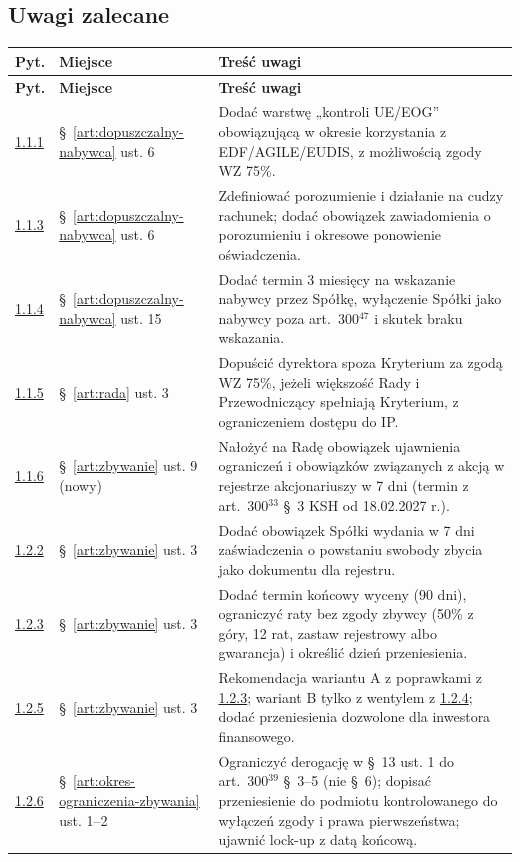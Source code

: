 \documentclass[12pt,a4paper]{report}
\begin{document}
\subsection*{Uwagi zalecane}
\begin{longtable}{@{}p{1.3cm} p{3.3cm} p{9.6cm}@{}}
\toprule
\textbf{Pyt.} & \textbf{Miejsce} & \textbf{Treść uwagi} \\
\midrule
\endfirsthead
\toprule
\textbf{Pyt.} & \textbf{Miejsce} & \textbf{Treść uwagi} \\
\midrule
\endhead
\hyperref[memo:1.1.1]{1.1.1} & §~\ref{art:dopuszczalny-nabywca} ust. 6 & Dodać warstwę „kontroli UE/EOG” obowiązującą w okresie korzystania z EDF/AGILE/EUDIS, z możliwością zgody WZ 75\%. \\
\hyperref[memo:1.1.3]{1.1.3} & §~\ref{art:dopuszczalny-nabywca} ust. 6 & Zdefiniować porozumienie i działanie na cudzy rachunek; dodać obowiązek zawiadomienia o porozumieniu i okresowe ponowienie oświadczenia. \\
\hyperref[memo:1.1.4]{1.1.4} & §~\ref{art:dopuszczalny-nabywca} ust. 15 & Dodać termin 3 miesięcy na wskazanie nabywcy przez Spółkę, wyłączenie Spółki jako nabywcy poza art.~300$^{47}$ i skutek braku wskazania. \\
\hyperref[memo:1.1.5]{1.1.5} & §~\ref{art:rada} ust. 3 & Dopuścić dyrektora spoza Kryterium za zgodą WZ 75\%, jeżeli większość Rady i Przewodniczący spełniają Kryterium, z ograniczeniem dostępu do IP. \\
\hyperref[memo:1.1.6]{1.1.6} & §~\ref{art:zbywanie} ust. 9 (nowy) & Nałożyć na Radę obowiązek ujawnienia ograniczeń i obowiązków związanych z akcją w rejestrze akcjonariuszy w 7 dni (termin z art.~300$^{33}$ §~3 KSH od 18.02.2027 r.). \\
\hyperref[memo:1.2.2]{1.2.2} & §~\ref{art:zbywanie} ust. 3 & Dodać obowiązek Spółki wydania w 7 dni zaświadczenia o powstaniu swobody zbycia jako dokumentu dla rejestru. \\
\hyperref[memo:1.2.3]{1.2.3} & §~\ref{art:zbywanie} ust. 3 & Dodać termin końcowy wyceny (90 dni), ograniczyć raty bez zgody zbywcy (50\% z góry, 12 rat, zastaw rejestrowy albo gwarancja) i określić dzień przeniesienia. \\
\hyperref[memo:1.2.5]{1.2.5} & §~\ref{art:zbywanie} ust. 3 & Rekomendacja wariantu A z poprawkami z \hyperref[memo:1.2.3]{1.2.3}; wariant B tylko z wentylem z \hyperref[memo:1.2.4]{1.2.4}; dodać przeniesienia dozwolone dla inwestora finansowego. \\
\hyperref[memo:1.2.6]{1.2.6} & §~\ref{art:okres-ograniczenia-zbywania} ust. 1--2 & Ograniczyć derogację w §~13 ust. 1 do art.~300$^{39}$ §~3--5 (nie §~6); dopisać przeniesienie do podmiotu kontrolowanego do wyłączeń zgody i prawa pierwszeństwa; ujawnić lock-up z datą końcową. \\

\end{longtable}
\end{document}
